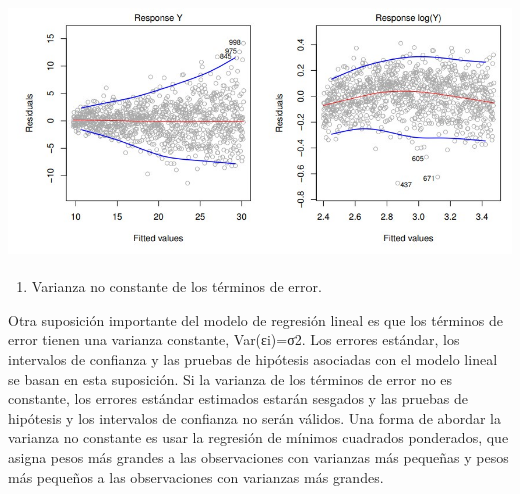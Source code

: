 \documentclass[
  letterpaper,
  DIV=11,
  numbers=noendperiod]{scrartcl}
\let\oldparagraph\paragraph
\renewcommand{\paragraph}[1]{\oldparagraph{#1}\mbox{}}
\providecommand{\tightlist}{%
  \setlength{\itemsep}{0pt}\setlength{\parskip}{0pt}}\usepackage{longtable,booktabs,array}
\begin{document}
\hypertarget{figura-11.-parcelas-residuales.-en-cada-parcela-la-luxednea-roja-es-un-ajuste-suave-a-la-residuales-destinados-a-facilitar-la-identificaciuxf3n-de-una-tendencia.-las-luxedneas-azules-rastrean-el-cuantiles-externos-de-los-residuales-y-enfatizar-patrones.-izquierda-la-forma-de-embudo-indica-heterocedasticidad.-derecha-la-respuesta-se-ha-transformado-logaruxedtmicamente-y-ahora-no-hay-evidencia-de-heteroscedasticidad.}{%
\paragraph{\texorpdfstring{\protect\includegraphics{images/gres.jpg}}{FIGURA 11. Parcelas residuales. En cada parcela, la línea roja es un ajuste suave a la residuales, destinados a facilitar la identificación de una tendencia. Las líneas azules rastrean el cuantiles externos de los residuales y enfatizar patrones. Izquierda: La forma de embudo indica heterocedasticidad. Derecha: la respuesta se ha transformado logarítmicamente y ahora no hay evidencia de heteroscedasticidad.}}\label{figura-11.-parcelas-residuales.-en-cada-parcela-la-luxednea-roja-es-un-ajuste-suave-a-la-residuales-destinados-a-facilitar-la-identificaciuxf3n-de-una-tendencia.-las-luxedneas-azules-rastrean-el-cuantiles-externos-de-los-residuales-y-enfatizar-patrones.-izquierda-la-forma-de-embudo-indica-heterocedasticidad.-derecha-la-respuesta-se-ha-transformado-logaruxedtmicamente-y-ahora-no-hay-evidencia-de-heteroscedasticidad.}}

\begin{enumerate}
\def\labelenumi{\arabic{enumi}.}
\setcounter{enumi}{2}
\tightlist
\item
  Varianza no constante de los términos de error.
\end{enumerate}

Otra suposición importante del modelo de regresión lineal es que los
términos de error tienen una varianza constante, Var(εi)=σ2. Los errores
estándar, los intervalos de confianza y las pruebas de hipótesis
asociadas con el modelo lineal se basan en esta suposición. Si la
varianza de los términos de error no es constante, los errores estándar
estimados estarán sesgados y las pruebas de hipótesis y los intervalos
de confianza no serán válidos. Una forma de abordar la varianza no
constante es usar la regresión de mínimos cuadrados ponderados, que
asigna pesos más grandes a las observaciones con varianzas más pequeñas
y pesos más pequeños a las observaciones con varianzas más grandes.
\end{document}
